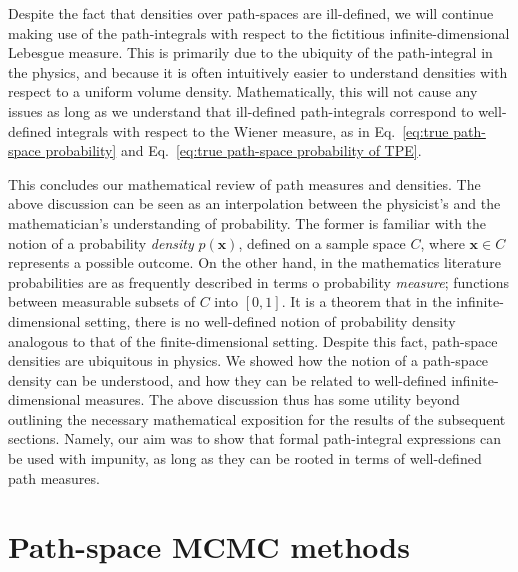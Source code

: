 Despite the fact that densities over path-spaces are ill-defined, we will continue making use of the path-integrals with respect to the fictitious infinite-dimensional Lebesgue measure. This is primarily due to the ubiquity of the path-integral in the physics, and because it is often intuitively easier to understand densities with respect to a uniform volume density. Mathematically, this will not cause any issues as long as we understand that ill-defined path-integrals correspond to well-defined integrals with respect to the Wiener measure, as in Eq.~\ref{eq:true path-space probability} and Eq.~\ref{eq:true path-space probability of TPE}.

This concludes our mathematical review of path measures and densities. The above discussion can be seen as an interpolation between the physicist's and the mathematician's understanding of probability. The former is familiar with the notion of a probability \textit{density} $p(\mathbf{x})$, defined on a sample space $C$, where $\mathbf{x} \in C$ represents a possible outcome. On the other hand, in the mathematics literature probabilities are as frequently described in terms o probability \textit{measure}; functions between measurable subsets of $C$ into $[0,1]$. It is a theorem that in the infinite-dimensional setting, there is no well-defined notion of probability density analogous to that of the finite-dimensional setting. Despite this fact, path-space densities are ubiquitous in physics. We showed how the notion of a path-space density can be understood, and how they can be related to well-defined infinite-dimensional measures. The above discussion thus has some utility beyond outlining the necessary mathematical exposition for the results of the subsequent sections. Namely, our aim was to show that formal path-integral expressions can be used with impunity, as long as they can be rooted in terms of well-defined path measures.

\section{Path-space MCMC methods} \label{sec:Path-space MCMC}

